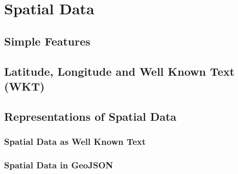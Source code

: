 \chapter{Spatial Data}
\lipsum[7-9]
\section{Simple Features}
\lipsum[9-11]
\section{Latitude, Longitude and Well Known Text (WKT)}
\lipsum[12-14]
\section{Representations of Spatial Data}
\lipsum[14-15]
\subsection{Spatial Data as Well Known Text}
\lipsum[17-18]
\subsection{Spatial Data in GeoJSON}
\lipsum[2-4]